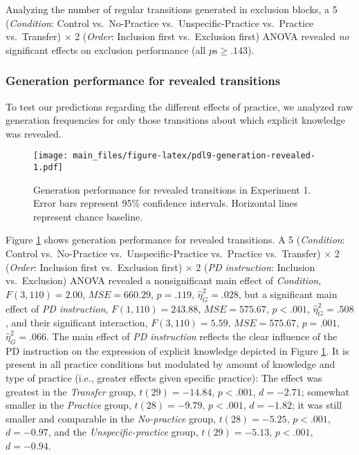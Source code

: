 \documentclass[english,,man]{apa6}
\begin{document}
Analyzing the number of regular transitions generated in exclusion blocks,
a 5 (\emph{Condition}: Control vs.~No-Practice vs.~Unspecific-Practice vs.~Practice vs.~Transfer) \(\times\) 2 (\emph{Order}: Inclusion first vs.~Exclusion first) ANOVA revealed \emph{no} significant effects on exclusion performance (all \(p\mathrm{s} \geq .143\)).

\hypertarget{generation-performance-for-revealed-transitions}{%
\subsubsection{Generation performance for revealed transitions}\label{generation-performance-for-revealed-transitions}}

To test our predictions regarding the different effects of practice, we analyzed raw generation frequencies for only those transitions about which explicit knowledge was revealed.

\begin{figure}
\centering
\texttt{[image: main\_files/figure-latex/pdl9-generation-revealed-1.pdf]}
\caption{\label{fig:pdl9-generation-revealed}Generation performance for revealed transitions in Experiment 1. Error bars represent 95\% confidence intervals. Horizontal lines represent chance baseline.}
\end{figure}

Figure \ref{fig:pdl9-generation-revealed} shows generation performance for revealed transitions.
A 5 (\emph{Condition}: Control vs.~No-Practice vs.~Unspecific-Practice vs.~Practice vs.~Transfer) \(\times\) 2 (\emph{Order}: Inclusion first vs.~Exclusion first) \(\times\) 2 (\emph{PD instruction}: Inclusion vs.~Exclusion) ANOVA revealed
a nonsignificant main effect of \emph{Condition}, \(F(3, 110) = 2.00\), \(\mathit{MSE} = 660.29\), \(p = .119\), \(\hat{\eta}^2_G = .028\),
but a significant main effect of \emph{PD instruction}, \(F(1, 110) = 243.88\), \(\mathit{MSE} = 575.67\), \(p < .001\), \(\hat{\eta}^2_G = .508\),
and their significant interaction, \(F(3, 110) = 5.59\), \(\mathit{MSE} = 575.67\), \(p = .001\), \(\hat{\eta}^2_G = .066\).
The main effect of \emph{PD instruction} reflects the clear influence of the PD instruction on the expression of explicit knowledge depicted in Figure \ref{fig:pdl9-generation-revealed}.
It is present in all practice conditions but modulated by amount of knowledge and type of practice (i.e., greater effects given specific practice):
The effect was greatest in the \emph{Transfer} group, \(t(29) = -14.84\), \(p < .001\), \(d = -2.71\);
somewhat smaller in the \emph{Practice} group, \(t(28) = -9.79\), \(p < .001\), \(d = -1.82\);
it was still smaller and comparable in the \emph{No-practice} group, \(t(28) = -5.25\), \(p < .001\), \(d = -0.97\), and the \emph{Unspecific-practice} group, \(t(29) = -5.13\), \(p < .001\), \(d = -0.94\).
\end{document}
